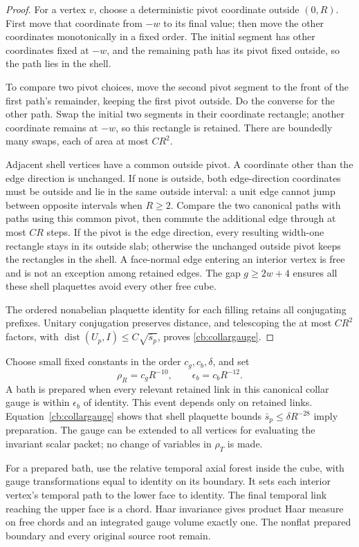 \begin{proof}
For a vertex \(v\), choose a deterministic pivot coordinate outside \((0,R)\). First move that coordinate from \(-w\) to its final value; then move the other coordinates monotonically in a fixed order. The initial segment has other coordinates fixed at \(-w\), and the remaining path has its pivot fixed outside, so the path lies in the shell.

To compare two pivot choices, move the second pivot segment to the front of the first path's remainder, keeping the first pivot outside. Do the converse for the other path. Swap the initial two segments in their coordinate rectangle; another coordinate remains at \(-w\), so this rectangle is retained. There are boundedly many swaps, each of area at most \(CR^2\).

Adjacent shell vertices have a common outside pivot. A coordinate other than the edge direction is unchanged. If none is outside, both edge-direction coordinates must be outside and lie in the same outside interval: a unit edge cannot jump between opposite intervals when \(R\ge2\). Compare the two canonical paths with paths using this common pivot, then commute the additional edge through at most \(CR\) steps. If the pivot is the edge direction, every resulting width-one rectangle stays in its outside slab; otherwise the unchanged outside pivot keeps the rectangles in the shell. A face-normal edge entering an interior vertex is free and is not an exception among retained edges. The gap \(g\ge2w+4\) ensures all these shell plaquettes avoid every other free cube.

The ordered nonabelian plaquette identity for each filling retains all conjugating prefixes. Unitary conjugation preserves distance, and telescoping the at most \(CR^2\) factors, with \(\operatorname{dist}(U_p,I)\le C\sqrt{\bar s_p}\), proves \eqref{cb:collargauge}.
\end{proof}

Choose small fixed constants in the order \(c_g,c_b,\delta\), and set
\[
 \rho_R=c_gR^{-10},\qquad \epsilon_b=c_bR^{-12}.
\]
A bath is prepared when every relevant retained link in this canonical collar gauge is within \(\epsilon_b\) of identity. This event depends only on retained links. Equation~\eqref{cb:collargauge} shows that shell plaquette bounds \(\bar s_p\le\delta R^{-28}\) imply preparation. The gauge can be extended to all vertices for evaluating the invariant scalar packet; no change of variables in \(\rho_T\) is made.

For a prepared bath, use the relative temporal axial forest inside the cube, with gauge transformations equal to identity on its boundary. It sets each interior vertex's temporal path to the lower face to identity. The final temporal link reaching the upper face is a chord. Haar invariance gives product Haar measure on free chords and an integrated gauge volume exactly one. The nonflat prepared boundary and every original source root remain.

